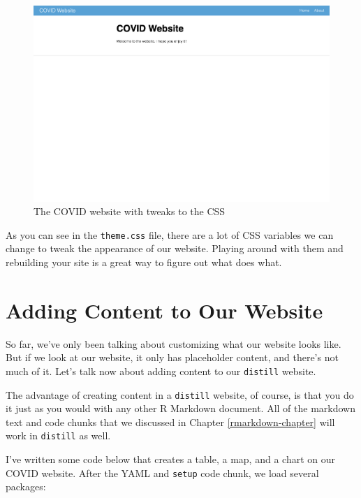 \documentclass[
]{book}
\begin{document}
\begin{figure}
\includegraphics[width=1\linewidth]{assets/covid-website-css-tweaks} \caption{The COVID website with tweaks to the CSS}\label{fig:covid-website-css-tweaks}
\end{figure}

As you can see in the \texttt{theme.css} file, there are a lot of CSS variables we can change to tweak the appearance of our website. Playing around with them and rebuilding your site is a great way to figure out what does what.

\hypertarget{adding-content-to-our-website}{%
\section*{Adding Content to Our Website}\label{adding-content-to-our-website}}

So far, we've only been talking about customizing what our website looks like. But if we look at our website, it only has placeholder content, and there's not much of it. Let's talk now about adding content to our \texttt{distill} website.

The advantage of creating content in a \texttt{distill} website, of course, is that you do it just as you would with any other R Markdown document. All of the markdown text and code chunks that we discussed in Chapter \ref{rmarkdown-chapter} will work in \texttt{distill} as well.

I've written some code below that creates a table, a map, and a chart on our COVID website. After the YAML and \texttt{setup} code chunk, we load several packages:
\end{document}
